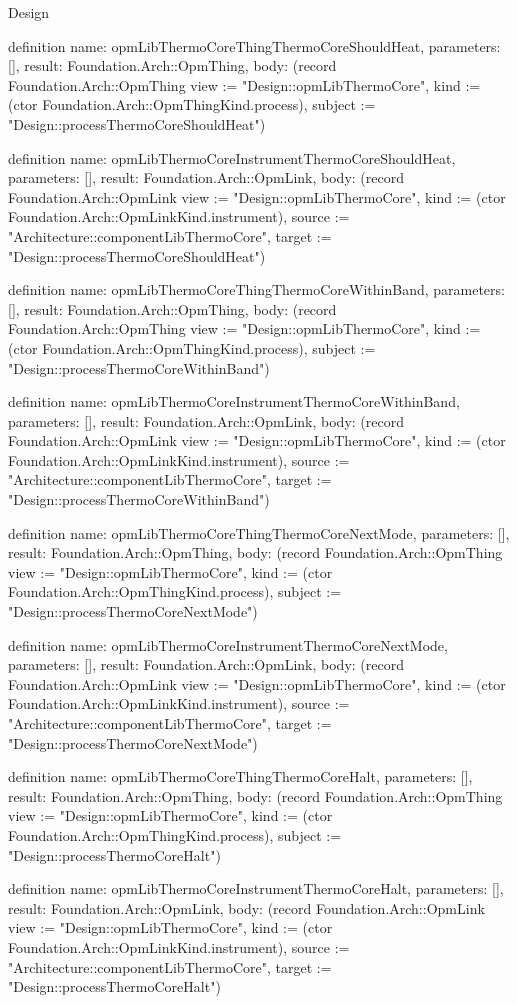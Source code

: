 \begin{lexlean}{Design}
\begin{semanticmodule}
definition{
  name: opmLibThermoCoreThingThermoCoreShouldHeat,
  parameters: [],
  result: Foundation.Arch::OpmThing,
  body: (record Foundation.Arch::OpmThing {view := "Design::opmLibThermoCore", kind := (ctor Foundation.Arch::OpmThingKind.process), subject := "Design::processThermoCoreShouldHeat"})
}

definition{
  name: opmLibThermoCoreInstrumentThermoCoreShouldHeat,
  parameters: [],
  result: Foundation.Arch::OpmLink,
  body: (record Foundation.Arch::OpmLink {view := "Design::opmLibThermoCore", kind := (ctor Foundation.Arch::OpmLinkKind.instrument), source := "Architecture::componentLibThermoCore", target := "Design::processThermoCoreShouldHeat"})
}

definition{
  name: opmLibThermoCoreThingThermoCoreWithinBand,
  parameters: [],
  result: Foundation.Arch::OpmThing,
  body: (record Foundation.Arch::OpmThing {view := "Design::opmLibThermoCore", kind := (ctor Foundation.Arch::OpmThingKind.process), subject := "Design::processThermoCoreWithinBand"})
}

definition{
  name: opmLibThermoCoreInstrumentThermoCoreWithinBand,
  parameters: [],
  result: Foundation.Arch::OpmLink,
  body: (record Foundation.Arch::OpmLink {view := "Design::opmLibThermoCore", kind := (ctor Foundation.Arch::OpmLinkKind.instrument), source := "Architecture::componentLibThermoCore", target := "Design::processThermoCoreWithinBand"})
}

definition{
  name: opmLibThermoCoreThingThermoCoreNextMode,
  parameters: [],
  result: Foundation.Arch::OpmThing,
  body: (record Foundation.Arch::OpmThing {view := "Design::opmLibThermoCore", kind := (ctor Foundation.Arch::OpmThingKind.process), subject := "Design::processThermoCoreNextMode"})
}

definition{
  name: opmLibThermoCoreInstrumentThermoCoreNextMode,
  parameters: [],
  result: Foundation.Arch::OpmLink,
  body: (record Foundation.Arch::OpmLink {view := "Design::opmLibThermoCore", kind := (ctor Foundation.Arch::OpmLinkKind.instrument), source := "Architecture::componentLibThermoCore", target := "Design::processThermoCoreNextMode"})
}

definition{
  name: opmLibThermoCoreThingThermoCoreHalt,
  parameters: [],
  result: Foundation.Arch::OpmThing,
  body: (record Foundation.Arch::OpmThing {view := "Design::opmLibThermoCore", kind := (ctor Foundation.Arch::OpmThingKind.process), subject := "Design::processThermoCoreHalt"})
}

definition{
  name: opmLibThermoCoreInstrumentThermoCoreHalt,
  parameters: [],
  result: Foundation.Arch::OpmLink,
  body: (record Foundation.Arch::OpmLink {view := "Design::opmLibThermoCore", kind := (ctor Foundation.Arch::OpmLinkKind.instrument), source := "Architecture::componentLibThermoCore", target := "Design::processThermoCoreHalt"})
}


\end{semanticmodule}
\end{lexlean}
